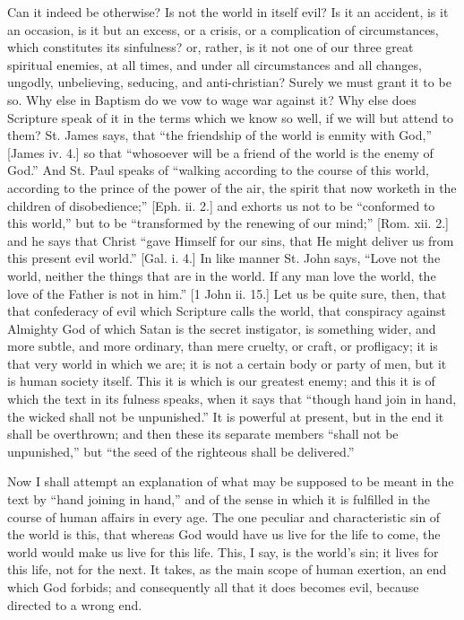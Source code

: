 Can it indeed be otherwise? Is not the world in itself evil? Is it
an accident, is it an occasion, is it but an excess, or a crisis, or a
complication of circumstances, which constitutes its sinfulness? or,
rather, is it not one of our three great spiritual enemies, at all
times, and under all circumstances and all changes, ungodly,
unbelieving, seducing, and anti-christian? Surely we must grant it to
be so. Why else in Baptism do we vow to wage war against it? Why else
does Scripture speak of it in the terms which we know so well, if we
will but attend to them? St. James says, that ``the friendship of
the world is enmity with God,'' [James iv. 4.] so that
``whosoever will be a friend of the world is the enemy of
God.'' And St. Paul speaks of ``walking according to the
course of this world, according to the prince of the power of the air,
the spirit that now worketh in the children of disobedience;''
[Eph. ii. 2.] and exhorts us not to be ``conformed to this
world,'' but to be ``transformed by the renewing of our
mind;'' [Rom. xii. 2.] and he says that Christ ``gave Himself
for our sins, that He might deliver us from this present evil
world.'' [Gal. i. 4.] In like manner St. John says, ``Love not
the world, neither the things that are in the world. If any man love
the world, the love of the Father is not in him.'' [1 John ii.
15.] Let us be quite sure, then, that that confederacy of evil which
Scripture calls the world, that conspiracy against Almighty God of
which Satan is the secret instigator, is something wider, and more
subtle, and more ordinary, than mere cruelty, or craft, or profligacy;
it is that very world in which we are; it is not a certain body or
party of men, but it is human society itself. This it is which is our
greatest enemy; and this it is of which the text in its fulness
speaks, when it says that ``though hand join in hand, the wicked
shall not be unpunished.'' It is powerful at present, but in the
end it shall be overthrown; and then these its separate members
``shall not be unpunished,'' but ``the seed of the
righteous shall be delivered.''

Now I shall attempt an explanation of what may be supposed to be
meant in the text by ``hand joining in hand,'' and of the
sense in which it is fulfilled in the course of human affairs in every
age. The one peculiar and characteristic sin of the world is this,
that whereas God would have us live for the life to come, the world
would make us live for this life. This, I say, is the world's sin; it
lives for this life, not for the next. It takes, as the main scope of
human exertion, an end which God forbids; and consequently all that it
does becomes evil, because directed to a wrong end.

